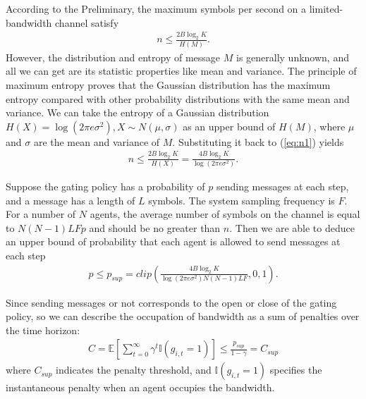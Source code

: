 \documentclass[letterpaper]{article} %
\begin{document}
According to the Preliminary, the maximum symbols per second on a limited-bandwidth channel satisfy
\begin{equation} \label{eq:n1}
\begin{gathered}
n  \leq \frac{2B \log_2 K}{H(M)}.
\end{gathered}
\end{equation}
However, the distribution and entropy of message $M$ is generally unknown, and all we can get are its statistic properties like mean and variance. The principle of maximum entropy  \cite{principle} proves that the Gaussian distribution has the maximum entropy compared with other probability distributions with the same mean and variance.
We can take the entropy of a Gaussian distribution $H(X)=\log (2\pi e \sigma^2), X \sim N(\mu, \sigma)$ as an upper bound of $H(M)$, where $\mu$ and $\sigma$ are the mean and variance of $M$.
Substituting it back to (\ref{eq:n1}) yields
\begin{equation} \label{eq:n2}
\begin{gathered}
n \leq \frac{2B \log_2 K}{H(X)} = \frac{4B \log_2 K}{\log (2\pi e \sigma^2)}.
\end{gathered}
\end{equation}

Suppose the gating policy has a probability of $p$ sending messages at each step, and a message has a length of $L$ symbols. The system sampling frequency is $F$. For a number of $N$ agents, the average number of symbols on the channel is equal to $N(N-1)LFp $ and should be no greater than $n$.
Then we are able to deduce an upper bound of probability that each agent is allowed to send messages at each step
\begin{equation} \label{eq:p2}
\begin{gathered}
p \leq p_{sup} = clip \left( \frac{4B \log_2 K}{\log (2\pi e \sigma^2) N(N-1)LF}, 0, 1 \right).
\end{gathered}
\end{equation}

Since sending messages or not corresponds to the open or close of the gating policy, so we can describe the occupation of bandwidth as a sum of penalties over the time horizon:
\begin{equation} \label{eq:C}
\begin{gathered}
C = \mathbb{E}\left[ \sum_{t=0}^{\infty} \gamma^t \mathbb I(g_{i,t}=1) \right]  \leq \frac{p_{sup}}{1-\gamma}=C_{sup}
\end{gathered}
\end{equation}
where $C_{sup}$ indicates the penalty threshold, and $\mathbb I(g_{i,t}=1)$ specifies the instantaneous penalty when an agent occupies the bandwidth.
\end{document}
